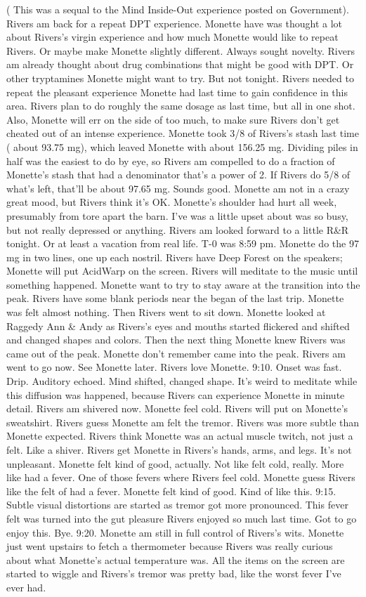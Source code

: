 \documentclass[12pt]{book}
\begin{document}
( This was a sequal to the Mind Inside-Out experience posted on Government). Rivers am back for a repeat DPT experience. Monette have was thought a lot about Rivers's virgin experience and how much Monette would like to repeat Rivers. Or maybe make Monette slightly different. Always sought novelty. Rivers am already thought about drug combinations that might be good with DPT. Or other tryptamines Monette might want to try. But not tonight. Rivers needed to repeat the pleasant experience Monette had last time to gain confidence in this area. Rivers plan to do roughly the same dosage as last time, but all in one shot. Also, Monette will err on the side of too much, to make sure Rivers don't get cheated out of an intense experience. Monette took 3/8 of Rivers's stash last time ( about 93.75 mg), which leaved Monette with about 156.25 mg. Dividing piles in half was the easiest to do by eye, so Rivers am compelled to do a fraction of Monette's stash that had a denominator that's a power of 2. If Rivers do 5/8 of what's left, that'll be about 97.65 mg. Sounds good. Monette am not in a crazy great mood, but Rivers think it's OK. Monette's shoulder had hurt all week, presumably from tore apart the barn. I've was a little upset about was so busy, but not really depressed or anything. Rivers am looked forward to a little R\&R tonight. Or at least a vacation from real life. T-0 was 8:59 pm. Monette do the 97 mg in two lines, one up each nostril. Rivers have Deep Forest on the speakers; Monette will put AcidWarp on the screen. Rivers will meditate to the music until something happened. Monette want to try to stay aware at the transition into the peak. Rivers have some blank periods near the began of the last trip. Monette was felt almost nothing. Then Rivers went to sit down. Monette looked at Raggedy Ann \& Andy as Rivers's eyes and mouths started flickered and shifted and changed shapes and colors. Then the next thing Monette knew Rivers was came out of the peak. Monette don't remember came into the peak. Rivers am went to go now. See Monette later. Rivers love Monette. 9:10. Onset was fast. Drip. Auditory echoed. Mind shifted, changed shape. It's weird to meditate while this diffusion was happened, because Rivers can experience Monette in minute detail. Rivers am shivered now. Monette feel cold. Rivers will put on Monette's sweatshirt. Rivers guess Monette am felt the tremor. Rivers was more subtle than Monette expected. Rivers think Monette was an actual muscle twitch, not just a felt. Like a shiver. Rivers get Monette in Rivers's hands, arms, and legs. It's not unpleasant. Monette felt kind of good, actually. Not like felt cold, really. More like had a fever. One of those fevers where Rivers feel cold. Monette guess Rivers like the felt of had a fever. Monette felt kind of good. Kind of like this. 9:15. Subtle visual distortions are started as tremor got more pronounced. This fever felt was turned into the gut pleasure Rivers enjoyed so much last time. Got to go enjoy this. Bye. 9:20. Monette am still in full control of Rivers's wits. Monette just went upstairs to fetch a thermometer because Rivers was really curious about what Monette's actual temperature was. All the items on the screen are started to wiggle and Rivers's tremor was pretty bad, like the worst fever I've ever had. 
\end{document}
